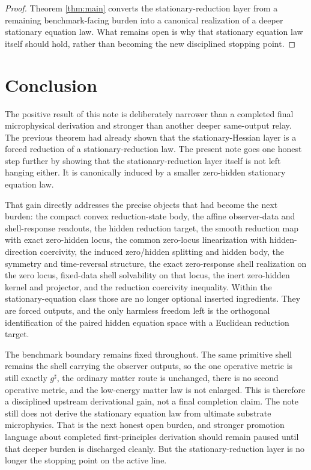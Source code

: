 \documentclass[11pt]{article}
\newcommand{\CompletedMetric}{g^{\sharp}}
\begin{document}
\begin{proof}
Theorem \ref{thm:main} converts the stationary-reduction layer from a remaining benchmark-facing burden into a canonical realization of a deeper stationary equation law. What remains open is why that stationary equation law itself should hold, rather than becoming the new disciplined stopping point.
\end{proof}

\section{Conclusion}

The positive result of this note is deliberately narrower than a completed final microphysical derivation and stronger than another deeper same-output relay. The previous theorem had already shown that the stationary-Hessian layer is a forced reduction of a stationary-reduction law. The present note goes one honest step further by showing that the stationary-reduction layer itself is not left hanging either. It is canonically induced by a smaller zero-hidden stationary equation law.

That gain directly addresses the precise objects that had become the next burden: the compact convex reduction-state body, the affine observer-data and shell-response readouts, the hidden reduction target, the smooth reduction map with exact zero-hidden locus, the common zero-locus linearization with hidden-direction coercivity, the induced zero/hidden splitting and hidden body, the symmetry and time-reversal structure, the exact zero-response shell realization on the zero locus, fixed-data shell solvability on that locus, the inert zero-hidden kernel and projector, and the reduction coercivity inequality. Within the stationary-equation class those are no longer optional inserted ingredients. They are forced outputs, and the only harmless freedom left is the orthogonal identification of the paired hidden equation space with a Euclidean reduction target.

The benchmark boundary remains fixed throughout. The same primitive shell remains the shell carrying the observer outputs, so the one operative metric is still exactly \(\CompletedMetric\), the ordinary matter route is unchanged, there is no second operative metric, and the low-energy matter law is not enlarged. This is therefore a disciplined upstream derivational gain, not a final completion claim. The note still does not derive the stationary equation law from ultimate substrate microphysics. That is the next honest open burden, and stronger promotion language about completed first-principles derivation should remain paused until that deeper burden is discharged cleanly. But the stationary-reduction layer is no longer the stopping point on the active line.
\end{document}
